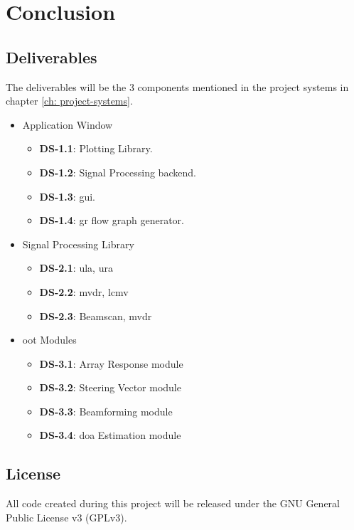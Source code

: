 \chapter{Conclusion}

\section{Deliverables} \label{sec: deliverables}

The deliverables will be the 3 components mentioned in the project systems in chapter \ref{ch: project-systems}.

\begin{itemize}
	\item Application Window
	\begin{itemize}
		\item \textbf{DS-1.1}: Plotting Library.
		\item \textbf{DS-1.2}: Signal Processing backend.
		\item \textbf{DS-1.3}: \ac{gui}.
		\item \textbf{DS-1.4}: \ac{gr} flow graph generator.
	\end{itemize}
	\item Signal Processing Library
	\begin{itemize}
		\item \textbf{DS-2.1}: \ac{ula}, \ac{ura}
		\item \textbf{DS-2.2}: \ac{mvdr}, \ac{lcmv}
		\item \textbf{DS-2.3}: Beamscan, \ac{mvdr}
	\end{itemize}
	\item \acf{oot} Modules
	\begin{itemize}
		\item \textbf{DS-3.1}: Array Response module
		\item \textbf{DS-3.2}: Steering Vector module
		\item \textbf{DS-3.3}: Beamforming module
		\item \textbf{DS-3.4}: \ac{doa} Estimation module
	\end{itemize}
\end{itemize}

\section{License}

All code created during this project will be released under the GNU General Public License v3 (GPLv3).

